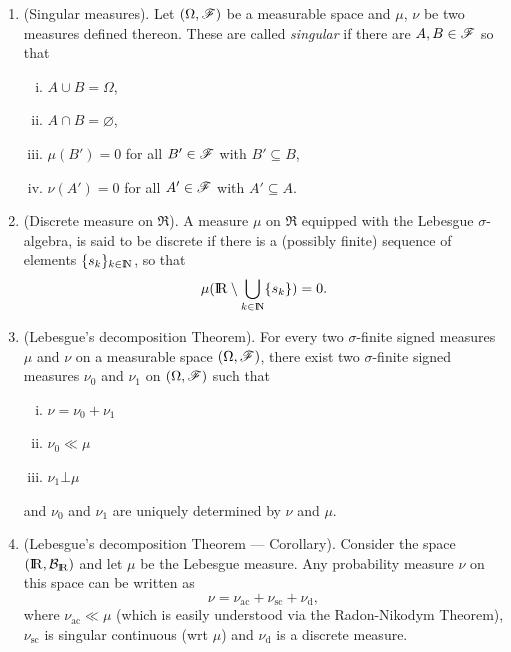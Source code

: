 \documentclass[a4paper,10pt]{scrbook}
\begin{document}
\begin{enumerate}
 \item (Singular measures). Let $(\Omega, \mathscr{F})$ be a measurable space and $\mu$, $\nu$
       be two measures defined thereon. These are called \textit{singular} if there are 
       $A,B\in\mathscr{F}$ so that
       \begin{enumerate}[i.]
        \item $A\cup B=\Omega$, 
        \item $A\cap B=\varnothing$,
        \item $\mu(B')=0$ for all $B'\in\mathscr{F}$ with $B'\subseteq B$,
        \item $\nu(A')=0$ for all $A'\in\mathscr{F}$ with $A'\subseteq A$.
       \end{enumerate}
 \item (Discrete measure on $\Re$). A measure $\mu$ on $\Re$ equipped with the Lebesgue $\sigma$-algebra,
       is said to be discrete if there is a (possibly finite) sequence of elements $\{s_k\}_{k\in\N}$,
       so that 
       \[
        \mu(\Re\setminus \bigcup_{k\in\N} \{s_k\}) = 0.
       \]
 \item (Lebesgue's decomposition Theorem). For every two $\sigma$-finite signed measures $\mu$ and $\nu$
       on a measurable space $(\Omega, \mathscr{F})$, there exist two $\sigma$-finite signed measures $\nu_0$ and $\nu_1$ 
       on $(\Omega, \mathscr{F})$ such that
       \begin{enumerate}[i.]
        \item $\nu = \nu_0 + \nu_1$
        \item $\nu_0\ll \mu$
        \item $\nu_1 {}\bot{} \mu$
       \end{enumerate}
       and $\nu_0$ and $\nu_1$ are uniquely determined by $\nu$ and $\mu$.
\item (Lebesgue's decomposition Theorem --- Corollary).
      Consider the space $(\Re,\B_\Re)$ and let $\mu$ be the Lebesgue measure. Any probability measure $\nu$
      on this space can be written as
      \[
       \nu = \nu_{\text{ac}} + \nu_{\text{sc}} + \nu_{\text{d}},
      \]
      where $\nu_{\text{ac}} \ll \mu$ (which is easily understood via the 
      Radon-Nikodym Theorem), $\nu_{\text{sc}}$ is singular continuous (wrt $\mu$) and $\nu_{\text{d}}$
      is a discrete measure.
             
\end{enumerate}
\end{document}
